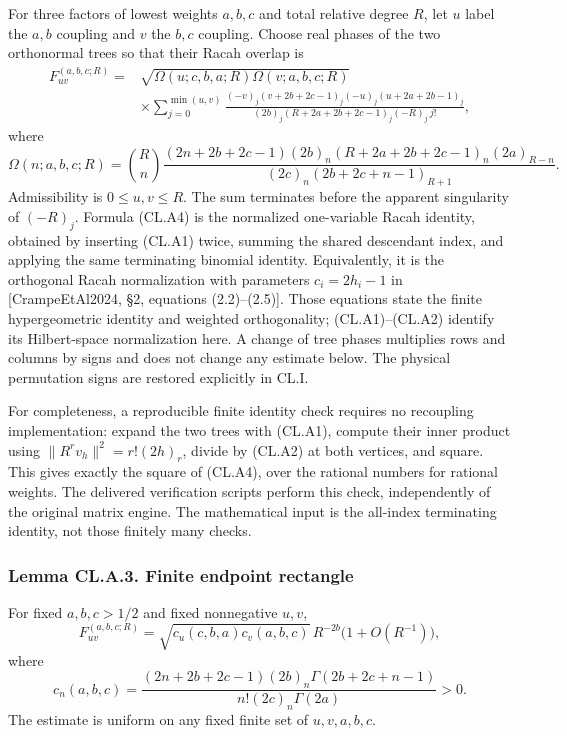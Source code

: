 For three factors of lowest weights \(a,b,c\) and total relative degree \(R\), let \(u\) label the \(a,b\) coupling and \(v\) the \(b,c\) coupling. Choose real phases of the two orthonormal trees so that their Racah overlap is \[
\begin{split}
F_{uv}^{(a,b,c;R)}
={}&\sqrt{\Omega(u;c,b,a;R)\Omega(v;a,b,c;R)}\\
&\times
\sum_{j=0}^{\min(u,v)}
\frac{(-v)_j(v+2b+2c-1)_j(-u)_j(u+2a+2b-1)_j}
{(2b)_j(R+2a+2b+2c-1)_j(-R)_j\,j!},
\end{split}
\tag{CL.A4}
\] where \[
\Omega(n;a,b,c;R)=
\binom Rn
\frac{(2n+2b+2c-1)(2b)_n
(R+2a+2b+2c-1)_n(2a)_{R-n}}
{(2c)_n(2b+2c+n-1)_{R+1}}.
\tag{CL.A5}
\] Admissibility is \(0\leq u,v\leq R\). The sum terminates before the apparent singularity of \((-R)_j\). Formula (CL.A4) is the normalized one-variable Racah identity, obtained by inserting (CL.A1) twice, summing the shared descendant index, and applying the same terminating binomial identity. Equivalently, it is the orthogonal Racah normalization with parameters \(c_i=2h_i-1\) in {[}CrampeEtAl2024, §2, equations (2.2)--(2.5){]}. Those equations state the finite hypergeometric identity and weighted orthogonality; (CL.A1)--(CL.A2) identify its Hilbert-space normalization here. A change of tree phases multiplies rows and columns by signs and does not change any estimate below. The physical permutation signs are restored explicitly in CL.I.

For completeness, a reproducible finite identity check requires no recoupling implementation: expand the two trees with (CL.A1), compute their inner product using \(\|R^rv_h\|^2=r!(2h)_r\), divide by (CL.A2) at both vertices, and square. This gives exactly the square of (CL.A4), over the rational numbers for rational weights. The delivered verification scripts perform this check, independently of the original matrix engine. The mathematical input is the all-index terminating identity, not those finitely many checks.

\hypertarget{lemma-cl.a.3.-finite-endpoint-rectangle}{%
\subsubsection{Lemma CL.A.3. Finite endpoint rectangle}\label{lemma-cl.a.3.-finite-endpoint-rectangle}}

For fixed \(a,b,c>1/2\) and fixed nonnegative \(u,v\), \[
F_{uv}^{(a,b,c;R)}
=\sqrt{c_u(c,b,a)c_v(a,b,c)}\,R^{-2b}
\bigl(1+O(R^{-1})\bigr),
\tag{CL.A6}
\] where \[
c_n(a,b,c)=
\frac{(2n+2b+2c-1)(2b)_n\Gamma(2b+2c+n-1)}
{n!(2c)_n\Gamma(2a)}>0.
\tag{CL.A7}
\] The estimate is uniform on any fixed finite set of \(u,v,a,b,c\).


